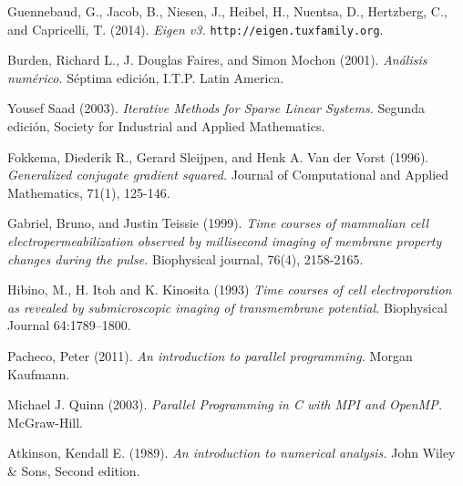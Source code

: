 \begin{thebibliography}{99}
	Guennebaud, G., Jacob, B., Niesen, J., Heibel, H., Nuentsa, D., Hertzberg, C., and Capricelli, T. (2014). \emph{Eigen v3.} \texttt{http://eigen.tuxfamily.org}.
	
	Burden, Richard L., J. Douglas Faires, and Simon Mochon (2001). \emph{Análisis numérico.} Séptima edición, I.T.P. Latin America.

	Yousef Saad (2003). \emph{Iterative Methods for Sparse Linear Systems.}	Segunda edición, Society for Industrial and Applied Mathematics.

	Fokkema, Diederik R., Gerard Sleijpen, and Henk A. Van der Vorst (1996). \emph{Generalized conjugate gradient squared.} Journal of Computational and Applied Mathematics, 71(1), 125-146.

	Gabriel, Bruno, and Justin Teissie (1999). \emph{Time courses of mammalian cell electropermeabilization observed by millisecond imaging of membrane property changes during the pulse.} Biophysical journal, 76(4), 2158-2165.

    Hibino, M., H. Itoh and K. Kinosita (1993) \emph{Time courses of cell electroporation as revealed by submicroscopic imaging of transmembrane potential.} Biophysical Journal 64:1789–1800.

	Pacheco, Peter (2011). \emph{An introduction to parallel programming.} Morgan Kaufmann.

	Michael J. Quinn (2003). \emph{Parallel Programming in C with MPI and OpenMP.} McGraw-Hill.
	
	Atkinson, Kendall E. (1989). \emph{An introduction to numerical analysis.} John Wiley \& Sons, Second edition.

\end{thebibliography}
